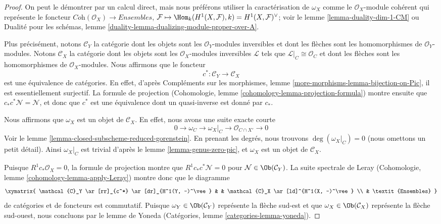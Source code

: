 \begin{proof}
On peut le démontrer par un calcul direct, mais nous préférons utiliser la caractérisation de $\omega_X$ comme le $\mathcal{O}_X$-module cohérent qui représente le foncteur $\textit{Coh}(\mathcal{O}_X) \to \textit{Ensembles}$, $\mathcal{F} \mapsto \Hom_k(H^1(X, \mathcal{F}), k) =
H^1(X, \mathcal{F})^\vee$; voir le lemme \ref{lemma-duality-dim-1-CM} ou Dualité pour les schémas, lemme \ref{duality-lemma-dualizing-module-proper-over-A}.

\medskip\noindent
Plus précisément, notons $\mathcal{C}_Y$ la catégorie dont les objets sont les $\mathcal{O}_Y$-modules inversibles et dont les flèches sont les homomorphismes de $\mathcal{O}_Y$-modules. Notons $\mathcal{C}_X$ la catégorie dont les objets sont les $\mathcal{O}_X$-modules inversibles $\mathcal{L}$ tels que $\mathcal{L}|_C \cong \mathcal{O}_C$ et dont les flèches sont les homomorphismes de $\mathcal{O}_X$-modules. Nous affirmons que le foncteur $$
c^* : \mathcal{C}_Y \to \mathcal{C}_X
$$ est une équivalence de catégories. En effet, d'après Compléments sur les morphismes, lemme \ref{more-morphisms-lemma-bijection-on-Pic}, il est essentiellement surjectif. La formule de projection (Cohomologie, lemme \ref{cohomology-lemma-projection-formula}) montre ensuite que $c_*c^*\mathcal{N} = \mathcal{N}$, et donc que $c^*$ est une équivalence dont un quasi-inverse est donné par $c_*$.

\medskip\noindent
Nous affirmons que $\omega_X$ est un objet de $\mathcal{C}_X$. En effet, nous avons une suite exacte courte $$
0 \to \omega_C \to \omega_X|_C \to \mathcal{O}_{C \cap X'} \to 0
$$ Voir le lemme \ref{lemma-closed-subscheme-reduced-gorenstein}. En prenant les degrés, nous trouvons $\deg(\omega_X|_C) = 0$ (nous omettons un petit détail). Ainsi $\omega_X|_C$ est trivial d'après le lemme \ref{lemma-genus-zero-pic}, et $\omega_X$ est un objet de $\mathcal{C}_X$.

\medskip\noindent
Puisque $R^1c_*\mathcal{O}_X = 0$, la formule de projection montre que $R^1c_*c^*\mathcal{N} = 0$ pour $\mathcal{N} \in \Ob(\mathcal{C}_Y)$. La suite spectrale de Leray (Cohomologie, lemme \ref{cohomology-lemma-apply-Leray}) montre donc que le diagramme $$
\xymatrix{
\mathcal{C}_Y \ar[rr]_{c^*} \ar[dr]_{H^1(Y, -)^\vee} & &
\mathcal{C}_X \ar[ld]^{H^1(X, -)^\vee} \\
& \textit{Ensembles}
}
$$ de catégories et de foncteurs est commutatif. Puisque $\omega_Y \in \Ob(\mathcal{C}_Y)$ représente la flèche sud-est et que $\omega_X \in \Ob(\mathcal{C}_X)$ représente la flèche sud-ouest, nous concluons par le lemme de Yoneda (Catégories, lemme \ref{categories-lemma-yoneda}).
\end{proof}


